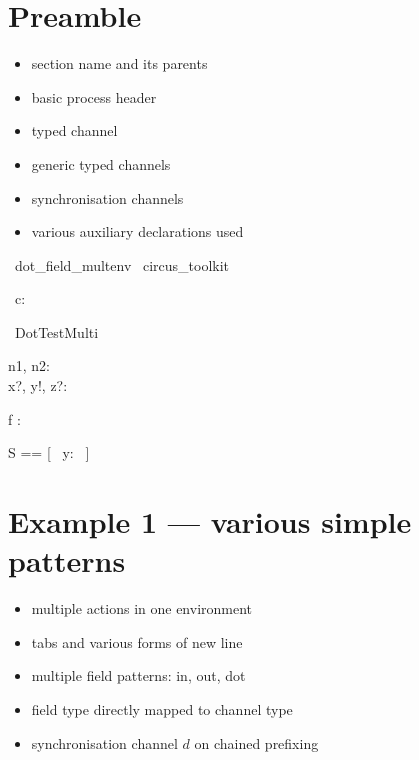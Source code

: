\documentclass{article}
\begin{document}
\section{Preamble}

\begin{itemize}
   \item section name and its parents
   \item basic process header
   \item typed channel
   \item generic typed channels
   \item synchronisation channels
   \item various auxiliary declarations used
\end{itemize}

\begin{zsection}
  \SECTION\ dot\_field\_multenv \parents\ circus\_toolkit
\end{zsection}

\begin{circus}
   \circchannel\ c: \nat \cross \nat \cross \nat \cross \nat
\end{circus}

\begin{circus}
   \circprocess\ DotTestMulti \circdef \circbegin
\end{circus}

\begin{axdef}
   n1, n2: \nat \\
   x?, y!, z?: \nat
\end{axdef}

\begin{axdef}
   f : \nat \fun \nat \cross \nat
\end{axdef}

\begin{zed}
   S == [~ y: \nat ~]
\end{zed}

\newpage
\section{Example 1 --- various simple patterns}

\begin{itemize}
   \item multiple actions in one environment
   \item tabs and various forms of new line
   \item multiple field patterns: in, out, dot
   \item field type directly mapped to channel type
   \item synchronisation channel $d$ on chained prefixing
\end{itemize}
\end{document}

